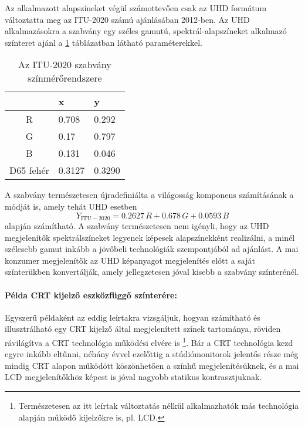 Az alkalmazott alapszíneket végül számottevően csak az UHD formátum változtatta meg az ITU-2020 számú ajánlásában 2012-ben.
Az UHD alkalmazásokra a szabvány egy széles gamutú, spektrál-alapszíneket alkalmazó színteret ajánl a \ref{tab:UHDTV_colorimetry} táblázatban látható paraméterekkel. 
\begin{table}[h!]
\caption{Az ITU-2020 szabvány színmérőrendszere}
\renewcommand*{\arraystretch}{1}
\label{tab:UHDTV_colorimetry}
\begin{center}
\small\addtolength{\tabcolsep}{15pt}
    \begin{tabular}[h!]{ @{}c | | l | l @{} }%
		&   x  	&    y \\ \hline
    R   &  0.708 &	0.292  \\
    G   &  0.17 &	0.797  \\
    B   & 0.131 &	0.046 \\
    D65 fehér     &  0.3127 & 0.3290 	  \\
    \end{tabular}
\end{center}
\end{table}
A szabvány természetesen újradefiniálta a világosság komponens számításának a módját is, amely tehát UHD esetben
\begin{equation}Y_{\mathrm{ITU}-2020} = 
   0.2627\,R + 0.678 \,G + 0.0593\,B 
\label{Eq:UHD_luminance}
\end{equation}
alapján számítható.
A szabvány természetesen nem igényli, hogy az UHD megjelenítők spektrálszíneket legyenek képesek alapszínekként realizálni, a minél szélesebb gamut inkább a jövőbeli technológiák szempontjából ad ajánlást.
A mai konzumer megjelenítők az UHD képanyagot megjelenítés előtt a saját színterükben konvertálják, amely jellegzetesen jóval kisebb a szabvány színterénél.

\paragraph{Példa CRT kijelző eszközfüggő színterére:\\}

Egyszerű példaként az eddig leírtakra vizsgáljuk, hogyan számítható és illusztrálható egy CRT kijelző által megjelenített színek tartománya, röviden rávilágítva a CRT technológia működési elvére is \footnote{Természetesen az itt leírtak változtatás nélkül alkalmazhatók más technológia alapján működő kijelzőkre is, pl. LCD.}.
Bár a CRT technológia kezd egyre inkább eltűnni, néhány évvel ezelőttig a stúdiómonitorok jelentős része még mindig CRT alapon működött köszönhetően a színhű megjelenítésüknek, és a mai LCD megjelenítőkhöz képest is jóval nagyobb statikus kontrasztjuknak.

